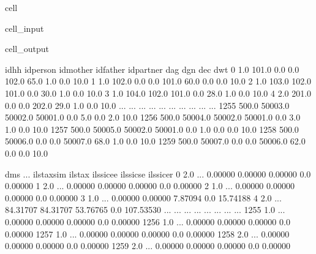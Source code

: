 \documentclass[letterpaper,10pt,english]{sphinxmanual}
\begin{document}
\begin{sphinxuseclass}{cell}
\begin{sphinxuseclass}{cell_input}
\begin{sphinxVerbatim}[commandchars=\\\{\}]
\PYG{p}{[}\PYG{p}{]}
\end{sphinxVerbatim}

\end{sphinxuseclass}
\begin{sphinxuseclass}{cell_output}
\begin{sphinxVerbatim}[commandchars=\\\{\}]
       idhh  idperson  idmother  idfather  idpartner   dag  dgn  dec   dwt  \PYGZbs{}
0       1.0     101.0       0.0       0.0      102.0  65.0  1.0  0.0  10.0   
1       1.0     102.0       0.0       0.0      101.0  60.0  0.0  0.0  10.0   
2       1.0     103.0     102.0     101.0        0.0  30.0  1.0  0.0  10.0   
3       1.0     104.0     102.0     101.0        0.0  28.0  1.0  0.0  10.0   
4       2.0     201.0       0.0       0.0      202.0  29.0  1.0  0.0  10.0   
...     ...       ...       ...       ...        ...   ...  ...  ...   ...   
1255  500.0   50003.0   50002.0   50001.0        0.0   5.0  0.0  2.0  10.0   
1256  500.0   50004.0   50002.0   50001.0        0.0   3.0  1.0  0.0  10.0   
1257  500.0   50005.0   50002.0   50001.0        0.0   1.0  0.0  0.0  10.0   
1258  500.0   50006.0       0.0       0.0    50007.0  68.0  1.0  0.0  10.0   
1259  500.0   50007.0       0.0       0.0    50006.0  62.0  0.0  0.0  10.0   

      dms  ...  ils\PYGZus{}taxsim   ils\PYGZus{}tax  ils\PYGZus{}sicee  ils\PYGZus{}sicse  ils\PYGZus{}sicer  \PYGZbs{}
0     2.0  ...     0.00000   0.00000    0.00000        0.0    0.00000   
1     2.0  ...     0.00000   0.00000    0.00000        0.0    0.00000   
2     1.0  ...     0.00000   0.00000    0.00000        0.0    0.00000   
3     1.0  ...     0.00000   0.00000    7.87094        0.0   15.74188   
4     2.0  ...    84.31707  84.31707   53.76765        0.0  107.53530   
...   ...  ...         ...       ...        ...        ...        ...   
1255  1.0  ...     0.00000   0.00000    0.00000        0.0    0.00000   
1256  1.0  ...     0.00000   0.00000    0.00000        0.0    0.00000   
1257  1.0  ...     0.00000   0.00000    0.00000        0.0    0.00000   
1258  2.0  ...     0.00000   0.00000    0.00000        0.0    0.00000   
1259  2.0  ...     0.00000   0.00000    0.00000        0.0    0.00000   


\end{sphinxVerbatim}
\end{sphinxuseclass}
\end{sphinxuseclass}
\end{document}
